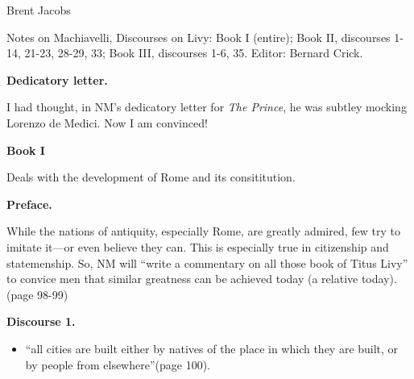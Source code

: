 \documentclass[11pt]{article}
\newcommand{\book}[1]{{\Large {\bfseries Book #1}}}
\newcommand{\discourse}[1]{{\bfseries Discourse #1.}}
\newcommand{\p}{page }
\begin{document}
\hfill Brent Jacobs

Notes on Machiavelli, Discourses on Livy: 
Book I (entire);
Book II, discourses 1-14, 21-23, 28-29,
33; 
Book III, discourses 1-6, 35.
Editor: Bernard Crick.

{\Large{\bfseries Dedicatory letter.}}

I had thought, in NM's dedicatory letter for \textsl{The Prince}, he was
subtley mocking Lorenzo de Medici. Now I am convinced!

\book{I}

Deals with the development of Rome and its consititution.

{\bfseries Preface.}

While the nations of antiquity, especially Rome, are
greatly admired, few try to imitate it---or even believe they can. 
This is especially true in citizenship and statemenship. So, NM will
``write a commentary on all those book of Titus Livy'' to convice men
that similar greatness can be achieved today (a relative today). (\p 98-99) 

\discourse{1}

\begin{itemize}
\item
	``all cities are built either by natives of the place in which they are 
	built, or by people from elsewhere''(\p 100). 
\end{itemize}
\end{document}
